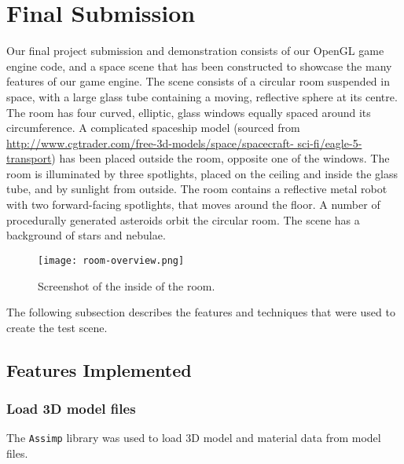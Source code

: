 \documentclass[11pt]{scrartcl} %
\newcommand{\libraryname}[1]{{\texttt{#1}}}
\begin{document}
\section{Final Submission}

    Our final project submission and demonstration consists of our OpenGL game
    engine code, and a space scene that has been constructed to showcase the
    many features of our game engine. The scene consists of a circular room
    suspended in space, with a large glass tube containing a moving, reflective
    sphere at its centre. The room has four curved, elliptic, glass windows
    equally spaced around its circumference. A complicated spaceship model
    (sourced from \url{http://www.cgtrader.com/free-3d-models/space/spacecraft-
    sci-fi/eagle-5-transport}) has been placed outside the room, opposite one
    of the windows. The room is illuminated by three spotlights, placed on the
    ceiling and inside the glass tube, and by sunlight from outside. The room
    contains a reflective metal robot with two forward-facing spotlights, that
    moves around the floor. A number of procedurally generated asteroids orbit
    the circular room. The scene has a background of stars and nebulae.


    \begin{figure}%
    \centering
        \texttt{[image: room-overview.png]}
        \caption[Space-room interior]{
            Screenshot of the inside of the room.
        }
        \label{room-overview}
    \end{figure}

    The following subsection describes the features and techniques that were
    used to create the test scene.

    \subsection{Features Implemented}

        \subsubsection{Load 3D model files}

            The \libraryname{Assimp} library was used to load 3D model and
            material data from model files.
\end{document}
